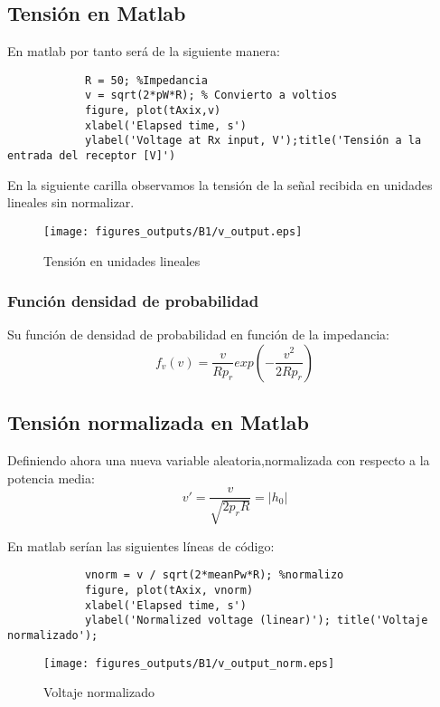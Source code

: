 \documentclass{article}
\begin{document}
    \subsection{Tensión en Matlab}
        \par En matlab por tanto será de la siguiente manera:
        \begin{lstlisting}
            R = 50; %Impedancia
            v = sqrt(2*pW*R); % Convierto a voltios
            figure, plot(tAxix,v)
            xlabel('Elapsed time, s')
            ylabel('Voltage at Rx input, V');title('Tensión a la entrada del receptor [V]')
        \end{lstlisting}
        \par En la siguiente carilla observamos la tensión de la señal recibida en unidades lineales sin normalizar.
        \clearpage
        \begin{figure}[h]
            \centering
            \texttt{[image: figures\_outputs/B1/v\_output.eps]}
            \caption{Tensión en unidades lineales}
            \label{fig:v_output}
        \end{figure}
        \subsubsection{Función densidad de probabilidad}
            \par Su función de densidad de probabilidad en función de la impedancia:
            \begin{equation}
            \tag{función densidad de probabilidad (R)}
                f_v(v) = \frac{v}{Rp_r}exp\left({-\frac{v^2}{2Rp_r}}\right)
                \label{eq:fdp_R}
            \end{equation}
    \subsection{Tensión normalizada en Matlab}
        \par Definiendo ahora una nueva variable aleatoria,normalizada con respecto a la potencia media:
        \begin{equation}
        \tag{voltaje a la entrada del receptor normalizado}
            v' =\frac{v}{ \sqrt{2p_rR}} = |h_0|
            \label{eq:voltaje_entrada_normalizado}
        \end{equation}
        \par En matlab serían las siguientes líneas de código:
        \begin{lstlisting}
            vnorm = v / sqrt(2*meanPw*R); %normalizo
            figure, plot(tAxix, vnorm)
            xlabel('Elapsed time, s')
            ylabel('Normalized voltage (linear)'); title('Voltaje normalizado');
        \end{lstlisting}
        \begin{figure}[h]
            \centering
            \texttt{[image: figures\_outputs/B1/v\_output\_norm.eps]}
            \caption{Voltaje normalizado}
            \label{fig:my_label}
        \end{figure}
        \clearpage
\end{document}
